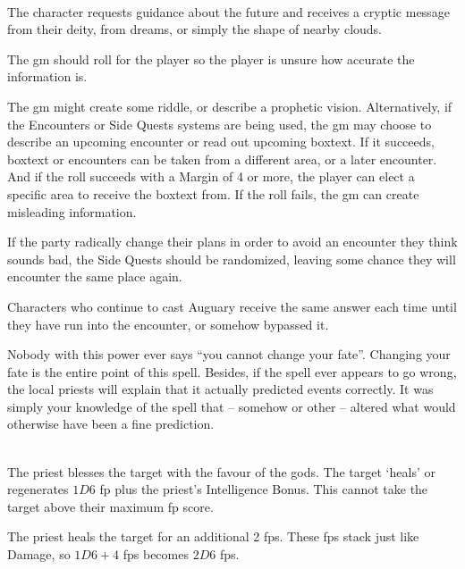 \begin{multicols}{2}
\spelllevel

\\
The character requests guidance about the future and receives a cryptic message from their deity, from dreams, or simply the shape of nearby clouds.

The \gls{gm} should roll for the player so the player is unsure how accurate the information is.

The \gls{gm} might create some riddle, or describe a prophetic vision.
Alternatively, if the Encounters or Side Quests systems are being used, the \gls{gm} may choose to describe an upcoming encounter or read out upcoming boxtext.\iftoggle{verbose}{\footnote{See page \pageref{encounters}.}}{}
If it succeeds, boxtext or encounters can be taken from a different area, or a later encounter.
And if the roll succeeds with a Margin of 4 or more, the player can elect a specific area to receive the boxtext from.
If the roll fails, the \gls{gm} can create misleading information.

If the party radically change their plans in order to avoid an encounter they think sounds bad, the Side Quests should be randomized, leaving some chance they will encounter the same place again.

Characters who continue to cast Auguary receive the same answer each time until they have run into the encounter, or somehow bypassed it.

Nobody with this power ever says ``you cannot change your fate''.  Changing your fate is the entire point of this spell.  Besides, if the spell ever appears to go wrong, the local priests will explain that it actually predicted events correctly.  It was simply your knowledge of the spell that -- somehow or other -- altered what would otherwise have been a fine prediction.

\\
The priest blesses the target with the favour of the gods. The target `heals' or regenerates $1D6$ \gls{fp} plus the priest's Intelligence Bonus. This cannot take the target above their maximum \gls{fp} score.


The priest heals the target for an additional 2 \glspl{fp}.
These \glspl{fp} stack just like Damage, so $1D6+4$ \glspl{fp} becomes $2D6$ \glspl{fp}.


\end{multicols}
